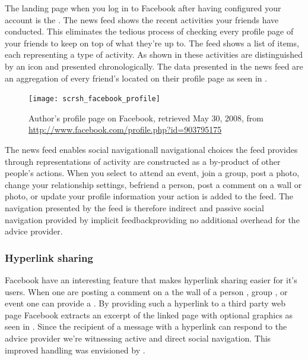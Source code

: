 The landing page when you log in to Facebook after having configured your
account is the  .
The news feed shows the recent activities your
friends have conducted. This eliminates the tedious process of checking every
profile page of your friends to keep on top of what they're up to.
The feed shows a list of items, each representing a type of activity. As
shown in 
these activities are distinguished by an
icon and presented chronologically. The data presented in the news feed are an
aggregation of every friend's  located on their profile page
 as seen in .

\begin{figure}
  \texttt{[image: scrsh\_facebook\_profile]}
  \caption[Facebook Profile]{%
     Author's profile page on Facebook,
     retrieved May 30, 2008, from
     \url{http://www.facebook.com/profile.php?id=903795175}}
  \label{figure:scrsh.facebook.profile}
\end{figure}

The news feed enables social navigation\dash{}all
navigational choices the feed provides
through representations of activity are constructed as a by-product of
other people's actions. When you select to attend an event, join a group,
post a photo, change your relationship settings, befriend a person, post a
comment on a wall or photo, or update your profile information your action
is added to the feed. The navigation presented by the feed
is therefore indirect and passive social navigation provided by implicit
feedback\dash{}providing no additional overhead for the advice provider.

\subsubsection{Hyperlink sharing}

Facebook have an interesting feature that makes hyperlink sharing easier for
it's users. When one are posting a comment on a the wall of a person
,
group
,
or event
one can provide a . By providing such a hyperlink to a
third party web page Facebook extracts an excerpt of the linked page with
optional graphics as seen in . Since the
recipient of a message with a hyperlink can respond to the advice provider
we're witnessing active and direct social navigation. This
improved  handling was envisioned by
\citet[]{dieberger97}.

